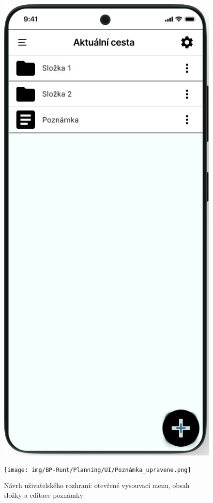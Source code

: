 \documentclass[czech, bc, kiv, he, iso690numb]{fasthesis}
\begin{document}
\begin{figure}[h!]
\begin{minipage}[h]{0.30\textwidth}
  \end{minipage}
  \hfill
  \begin{minipage}[h]{0.30\textwidth}
    \includegraphics[width=\textwidth]{img/BP-Runt/Planning/UI/ListView_edited.png}
  \end{minipage}
  \hfill
  \begin{minipage}[h]{0.30\textwidth}
    \texttt{[image: img/BP-Runt/Planning/UI/Poznámka\_upravene.png]}
  \end{minipage}
  \caption{Návrh uživatelského rozhraní: otevřené vysouvací menu, obsah složky a editace poznámky}
  \label{fig:planning_UI_2}
\end{figure}
\end{document}
